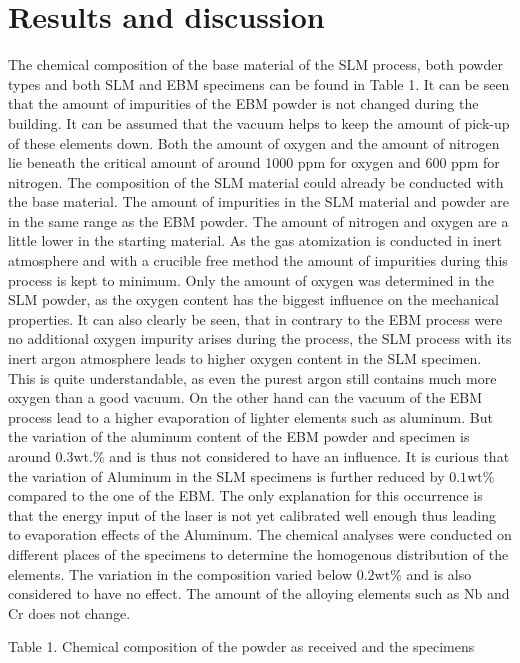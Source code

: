 \documentclass[10pt]{article}
\begin{document}
\section*{Results and discussion}
The chemical composition of the base material of the SLM process, both powder types and both SLM and EBM specimens can be found in Table 1. It can be seen that the amount of impurities of the EBM powder is not changed during the building. It can be assumed that the vacuum helps to keep the amount of pick-up of these elements down. Both the amount of oxygen and the amount of nitrogen lie beneath the critical amount of around 1000 ppm for oxygen and 600 ppm for nitrogen. The composition of the SLM material could already be conducted with the base material. The amount of impurities in the SLM material and powder are in the same range as the EBM powder. The amount of nitrogen and oxygen are a little lower in the starting material. As the gas atomization is conducted in inert atmosphere and with a crucible free method the amount of impurities during this process is kept to minimum. Only the amount of oxygen was determined in the SLM powder, as the oxygen content has the biggest influence on the mechanical properties. It can also clearly be seen, that in contrary to the EBM process were no additional oxygen impurity arises during the process, the SLM process with its inert argon atmosphere leads to higher oxygen content in the SLM specimen. This is quite understandable, as even the purest argon still contains much more oxygen than a good vacuum. On the other hand can the vacuum of the EBM process lead to a higher evaporation of lighter elements such as aluminum. But the variation of the aluminum content of the EBM powder and specimen is around $0.3 \mathrm{wt} . \%$ and is thus not considered to have an influence. It is curious that the variation of Aluminum in the SLM specimens is further reduced by $0.1 \mathrm{wt} \%$ compared to the one of the EBM. The only explanation for this occurrence is that the energy input of the laser is not yet calibrated well enough thus leading to evaporation effects of the Aluminum. The chemical analyses were conducted on different places of the specimens to determine the homogenous distribution of the elements. The variation in the composition varied below $0.2 \mathrm{wt} \%$ and is also considered to have no effect. The amount of the alloying elements such as $\mathrm{Nb}$ and $\mathrm{Cr}$ does not change.

Table 1. Chemical composition of the powder as received and the specimens
\end{document}
